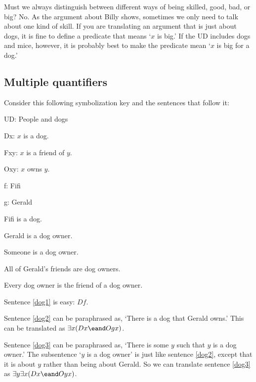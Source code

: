 Must we always distinguish between different ways of being skilled, good, bad, or big? No. As the argument about Billy shows, sometimes we only need to talk about one kind of skill. If you are translating an argument that is just about dogs, it is fine to define a predicate that means `$x$ is big.' If the UD includes dogs and mice, however, it is probably best to make the predicate mean `$x$ is big for a dog.'



\subsection{Multiple quantifiers}
Consider this following symbolization key and the sentences that follow it:
\begin{ekey}
\item{UD:} People and dogs
\item{Dx:} $x$ is a dog.
\item{Fxy:} $x$ is a friend of $y$.
\item{Oxy:} $x$ owns $y$.
\item{f:} Fifi
\item{g:} Gerald
\end{ekey}

\begin{earg}
\item[\ex{dog1}] Fifi is a dog.
\item[\ex{dog2}] Gerald is a dog owner.
\item[\ex{dog3}] Someone is a dog owner.
\item[\ex{dog4}] All of Gerald's friends are dog owners.
\item[\ex{dog5}] Every dog owner is the friend of a dog owner.
\end{earg}

Sentence \ref{dog1} is easy: $Df$.

Sentence \ref{dog2} can be paraphrased as, `There is a dog that Gerald owns.' This can be translated as $\exists x(Dx \eand Ogx)$.

Sentence \ref{dog3} can be paraphrased as, `There is some $y$ such that $y$ is a dog owner.' The subsentence `$y$ is a dog owner' is just like sentence \ref{dog2}, except that it is about $y$ rather than being about Gerald. So we can translate sentence \ref{dog3} as $\exists y \exists x(Dx \eand Oyx)$. 

